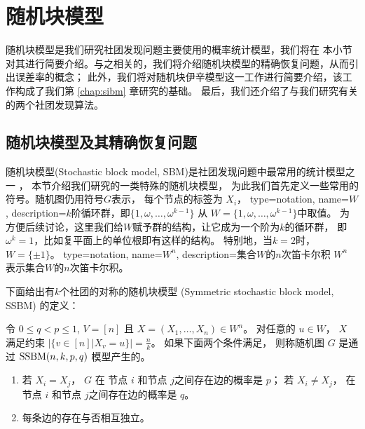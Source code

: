 \section{随机块模型}\label{sec:sbm}
随机块模型是我们研究社团发现问题主要使用的概率统计模型，我们将在
本小节对其进行简要介绍。与之相关的，我们将介绍随机块模型的精确恢复问题，从而引出误差率的概念；
此外，我们将对随机块伊辛模型这一工作进行简要介绍，该工作构成了我们第 \ref{chap:sibm} 章研究的基础。
最后，我们还介绍了与我们研究有关的两个社团发现算法。

\subsection{随机块模型及其精确恢复问题}\label{sec:exact_recovery}
随机块模型(Stochastic block model, SBM)是社团发现问题中最常用的统计模型之一
\cite{holland1983stochastic, abbe2017community}，
本节介绍我们研究的一类特殊的随机块模型，
%
为此我们首先定义一些常用的符号。随机图仍用符号$G$表示，
每个节点的标签为 $X_i$，
{
  type=notation,
  name={\ensuremath{W}},
  description={$k$阶循环群，即$\{1, \omega, \dots, \omega^{k-1}\}$}
}
从  $W= \{1, \omega, \dots, \omega^{k-1}\}$中取值。
为方便后续讨论，这里我们给$W$赋予群的结构，让它成为一个阶为$k$的循环群，
即$\omega^k=1$，比如复平面上的单位根即有这样的结构。
特别地，当$k=2$时，$W=\{\pm 1\}$。
{
  type=notation,
  name={\ensuremath{W^n}},
  description={集合$W$的$n$次笛卡尔积}
}
$W^n$ 表示集合$W$的$n$次笛卡尔积。 

下面给出有$k$个社团的对称的随机块模型
(Symmetric stochastic block model, SSBM)
的定义： 
	\begin{definition}\label{def:SSBM}
	令 $0\leq q<p\leq 1$, $V=[n]$ 且
  $X=(X_1,\dots,X_n)\in W^n$。 对任意的 $u\in W$，
  $X$ 满足约束
  $|\{v \in [n] | X_v = u\}| = \frac{n}{k}$。
	如果下面两个条件满足，
  则称随机图 $G$ 是通过 $\operatorname{SSBM}(n,k,p,q)$ 模型产生的。 
	\begin{enumerate}
	\item 若 $X_i=X_j$， $G$ 在 节点 $i$ 和节点 $j$之间存在边的概率是 $p$； 
 若 $X_i \neq X_j$，  在 节点 $i$ 和节点 $j$之间存在边的概率是 $q$。
	\item 每条边的存在与否相互独立。
	\end{enumerate}
\end{definition}

